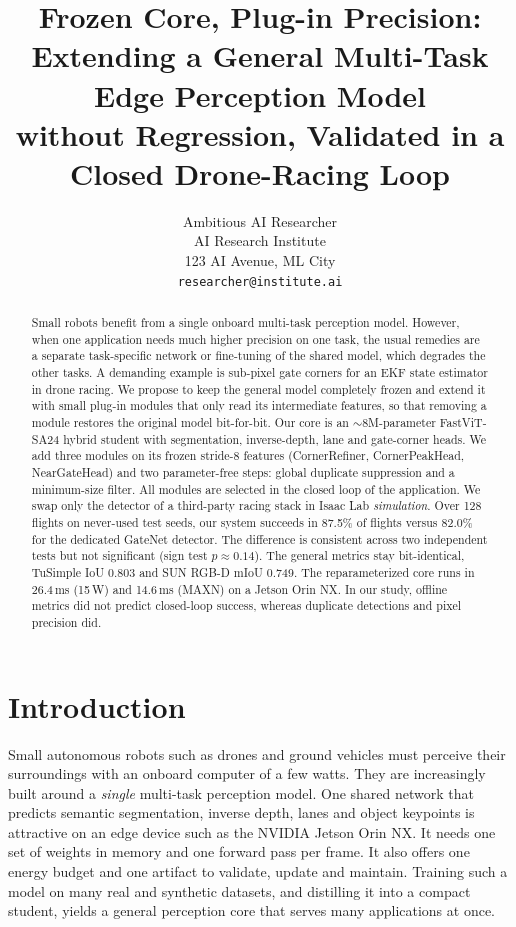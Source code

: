 \documentclass[10pt,twocolumn,letterpaper]{article}
\title{Frozen Core, Plug-in Precision: Extending a General Multi-Task Edge Perception Model\\without Regression, Validated in a Closed Drone-Racing Loop}
\author{Ambitious AI Researcher\\
AI Research Institute\\
123 AI Avenue, ML City\\
{\tt\small researcher@institute.ai}
}
\begin{document}
\maketitle

\begin{abstract}
Small robots benefit from a single onboard multi-task perception model. However, when one application needs much higher precision on one task, the usual remedies are a separate task-specific network or fine-tuning of the shared model, which degrades the other tasks. A demanding example is sub-pixel gate corners for an EKF state estimator in drone racing. We propose to keep the general model completely frozen and extend it with small plug-in modules that only read its intermediate features, so that removing a module restores the original model bit-for-bit. Our core is an $\sim$8M-parameter FastViT-SA24 hybrid student with segmentation, inverse-depth, lane and gate-corner heads. We add three modules on its frozen stride-8 features (CornerRefiner, CornerPeakHead, NearGateHead) and two parameter-free steps: global duplicate suppression and a minimum-size filter. All modules are selected in the closed loop of the application. We swap only the detector of a third-party racing stack in Isaac Lab \emph{simulation}. Over 128 flights on never-used test seeds, our system succeeds in 87.5\% of flights versus 82.0\% for the dedicated GateNet detector. The difference is consistent across two independent tests but not significant (sign test $p\approx0.14$). The general metrics stay bit-identical, \eg TuSimple IoU 0.803 and SUN RGB-D mIoU 0.749. The reparameterized core runs in 26.4\,ms (15\,W) and 14.6\,ms (MAXN) on a Jetson Orin NX. In our study, offline metrics did not predict closed-loop success, whereas duplicate detections and pixel precision did.
\end{abstract}

\section{Introduction}
\label{sec:intro}
Small autonomous robots such as drones and ground vehicles must perceive their surroundings with an onboard computer of a few watts. They are increasingly built around a \emph{single} multi-task perception model. One shared network that predicts semantic segmentation, inverse depth, lanes and object keypoints is attractive on an edge device such as the NVIDIA Jetson Orin NX. It needs one set of weights in memory and one forward pass per frame. It also offers one energy budget and one artifact to validate, update and maintain. Training such a model on many real and synthetic datasets, and distilling it into a compact student, yields a general perception core that serves many applications at once.
\end{document}
